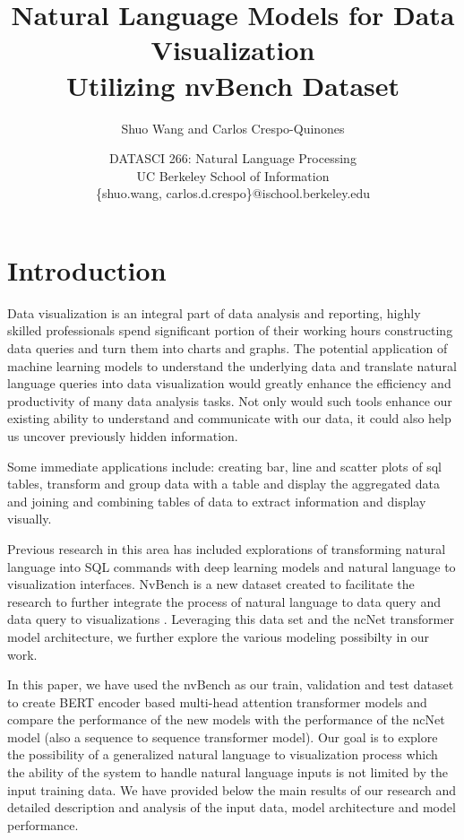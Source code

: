 \documentclass[
	a4paper, %
	10pt, %
	unnumberedsections, %
	twoside, %
]{t0003}
\title{Natural Language Models for Data Visualization\\ Utilizing nvBench Dataset} %
\author{
	Shuo Wang and Carlos Crespo-Quinones
}
\date{\footnotesize DATASCI 266: Natural Language Processing \\ UC Berkeley School of Information \\ \{shuo.wang, carlos.d.crespo\}@ischool.berkeley.edu}
\begin{document}
\maketitle %


\section{Introduction}

Data visualization is an integral part of data analysis and reporting, highly skilled professionals spend significant portion of their working hours constructing data queries and turn them into charts and graphs. The potential application of machine learning models to understand the underlying data and translate natural language queries into data visualization would greatly enhance the efficiency and productivity of many data analysis tasks. Not only would such tools enhance our existing ability to understand and communicate with our data, it could also help us uncover previously hidden information.

Some immediate applications include: creating bar, line and scatter plots of sql tables, transform and group data with a table and display the aggregated data and joining and combining tables of data to extract information and display visually.

Previous research in this area has included explorations of transforming natural language into SQL commands\cite{Zhong:2017qr, Yu:2019qr} with deep learning models and natural language to visualization interfaces\cite{Cox:2001qr}. NvBench is a new dataset created to facilitate the research to further integrate the process of natural language to data query and data query to visualizations\cite{Luo:2021qr} . Leveraging this data set and the ncNet transformer model architecture\cite{Luo:2022qr}, we further explore the various modeling possibilty in our work.

In this paper, we have used the nvBench as our train, validation and test dataset to create BERT encoder based multi-head attention transformer models and compare the performance of the new models with the performance of the ncNet model (also a sequence to sequence transformer model). Our goal is to explore the possibility of a generalized natural language to visualization process which the ability of the system to handle natural language inputs is not limited by the input training data. We have provided below the main results of our research and detailed description and analysis of the input data, model architecture and model performance.
\end{document}
